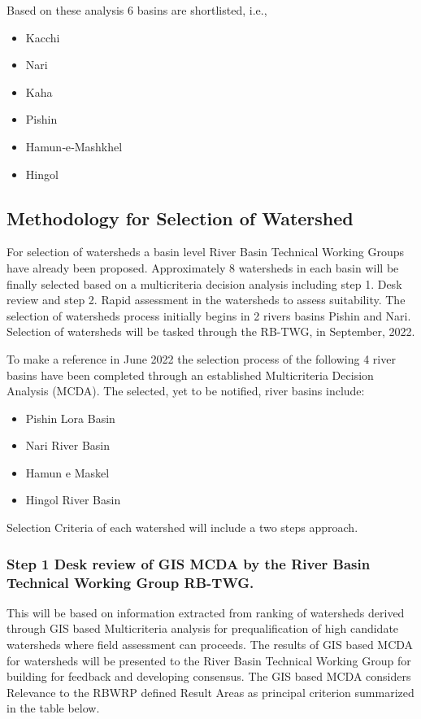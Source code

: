 Based on these analysis 6 basins are shortlisted, i.e.,
\begin{itemize}
    \item Kacchi
    \item Nari
    \item Kaha
    \item Pishin
    \item Hamun‐e‐Mashkhel
    \item Hingol
\end{itemize}

\subsection{Methodology for Selection of Watershed}

For selection of watersheds a basin level River Basin Technical Working Groups have already been proposed. Approximately 8 watersheds in each basin will be finally selected based on a multicriteria decision analysis including step 1. Desk review and step 2. Rapid assessment in the watersheds to assess suitability. The selection of watersheds process initially begins in 2 rivers basins Pishin and Nari. Selection of watersheds will be tasked through the RB-TWG, in September, 2022.

To make a reference in June 2022 the selection process of the following 4 river basins have been completed through an established Multicriteria Decision Analysis (MCDA). The selected, yet to be notified, river basins include:
\begin{itemize}
    \item Pishin Lora Basin
    \item Nari River Basin
    \item Hamun e Maskel
    \item Hingol River Basin
\end{itemize}

Selection Criteria of each watershed will include a two steps approach.

\subsubsection{Step 1 Desk review of GIS MCDA by the River Basin Technical Working Group RB-TWG. }

This will be based on information extracted from ranking of watersheds derived through GIS based Multicriteria analysis for prequalification of high candidate watersheds where field assessment can proceeds. The results of GIS based MCDA for watersheds will be presented to the River Basin Technical Working Group for building for feedback and developing consensus. The GIS based MCDA considers Relevance to the RBWRP defined Result Areas as principal criterion summarized in the table below.

